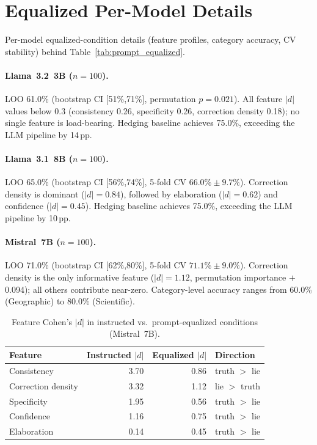 \section{Equalized Per-Model Details}
\label{app:equalized_details}
\label{sec:llama8b_equalized}
\label{sec:qwen14b_equalized}
\label{sec:qwen7b_equalized}
\label{sec:haiku_equalized}

Per-model equalized-condition details (feature profiles, category accuracy, CV stability) behind Table~\ref{tab:prompt_equalized}.

\paragraph{Llama~3.2~3B ($n=100$).}
LOO 61.0\% (bootstrap CI [51\%,71\%], permutation $p=0.021$). All feature $|d|$ values below 0.3 (consistency 0.26, specificity 0.26, correction density 0.18); no single feature is load-bearing. Hedging baseline achieves 75.0\%, exceeding the LLM pipeline by 14\,pp.

\paragraph{Llama~3.1~8B ($n=100$).}
LOO 65.0\% (bootstrap CI [56\%,74\%], 5-fold CV $66.0\% \pm 9.7\%$). Correction density is dominant ($|d|=0.84$), followed by elaboration ($|d|=0.62$) and confidence ($|d|=0.45$). Hedging baseline achieves 75.0\%, exceeding the LLM pipeline by 10\,pp.

\paragraph{Mistral~7B ($n=100$).}
LOO 71.0\% (bootstrap CI [62\%,80\%], 5-fold CV $71.1\% \pm 9.0\%$). Correction density is the only informative feature ($|d|=1.12$, permutation importance $+$0.094); all others contribute near-zero. Category-level accuracy ranges from 60.0\% (Geographic) to 80.0\% (Scientific).

\begin{table}[h]
\centering
\caption{Feature Cohen's $|d|$ in instructed vs.\ prompt-equalized conditions (Mistral~7B).}
\label{tab:equalized_feature_d}
\begin{tabular}{lrrl}
\toprule
\textbf{Feature} & \textbf{Instructed $|d|$} & \textbf{Equalized $|d|$} & \textbf{Direction} \\
\midrule
Consistency   & 3.70 & 0.86 & truth $>$ lie \\
Correction density & 3.32 & 1.12 & lie $>$ truth \\
Specificity   & 1.95 & 0.56 & truth $>$ lie \\
Confidence    & 1.16 & 0.75 & truth $>$ lie \\
Elaboration   & 0.14 & 0.45 & truth $>$ lie \\
\bottomrule
\end{tabular}
\end{table}

